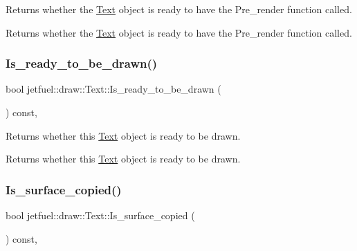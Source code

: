 Returns whether the \hyperlink{classjetfuel_1_1draw_1_1Text}{Text} object is ready to have the Pre\+\_\+render function called. 

Returns whether the \hyperlink{classjetfuel_1_1draw_1_1Text}{Text} object is ready to have the Pre\+\_\+render function called. \mbox{\label{classjetfuel_1_1draw_1_1Text_a2626023a1aa6998147ea40670d0fab8d}} 
\subsubsection{\texorpdfstring{Is\+\_\+ready\+\_\+to\+\_\+be\+\_\+drawn()}{Is\_ready\_to\_be\_drawn()}}
{\footnotesize\ttfamily bool jetfuel\+::draw\+::\+Text\+::\+Is\+\_\+ready\+\_\+to\+\_\+be\+\_\+drawn (\begin{DoxyParamCaption}{ }\end{DoxyParamCaption}) const\hspace{0.3cm}{\ttfamily [inline]}, {\ttfamily [protected]}}



Returns whether this \hyperlink{classjetfuel_1_1draw_1_1Text}{Text} object is ready to be drawn. 

Returns whether this \hyperlink{classjetfuel_1_1draw_1_1Text}{Text} object is ready to be drawn. \mbox{\label{classjetfuel_1_1draw_1_1Text_a3095fe89cec6db7a6a38f722dc249ccb}} 
\subsubsection{\texorpdfstring{Is\+\_\+surface\+\_\+copied()}{Is\_surface\_copied()}}
{\footnotesize\ttfamily bool jetfuel\+::draw\+::\+Text\+::\+Is\+\_\+surface\+\_\+copied (\begin{DoxyParamCaption}{ }\end{DoxyParamCaption}) const\hspace{0.3cm}{\ttfamily [inline]}, {\ttfamily [protected]}}




